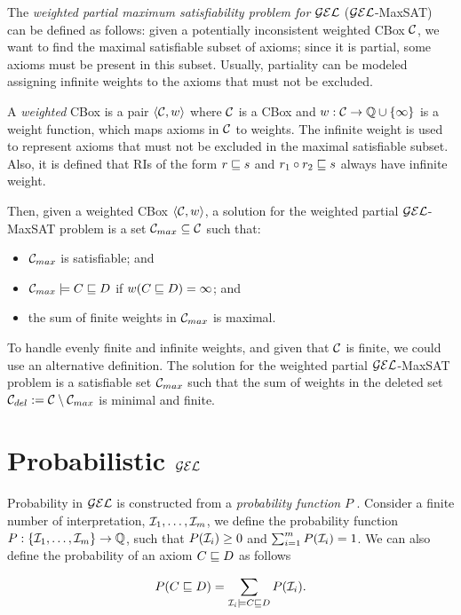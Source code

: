 The \emph{weighted partial maximum satisfiability problem for} $\mathcal{GEL}$ ($\mathcal{GEL}$-MaxSAT) can be defined as follows: given a potentially inconsistent weighted CBox $\mathcal{C}$, we want to find the maximal satisfiable subset of axioms; since it is partial, some axioms must be present in this subset. Usually, partiality can be modeled assigning infinite weights to the axioms that must not be excluded.

A \emph{weighted} CBox is a pair $\langle\mathcal{C}, w\rangle$ where $\mathcal{C}$ is a CBox and $w: \mathcal{C} \to \mathbb{Q} \cup \{\infty\}$ is a weight function, which maps axioms in $\mathcal{C}$ to weights. The infinite weight is used to represent axioms that must not be excluded in the maximal satisfiable subset. Also, it is defined that RIs of the form $r \sqsubseteq s$ and $r_1 \circ r_2 \sqsubseteq s$ always have infinite weight.

Then, given a weighted CBox $\langle\mathcal{C}, w\rangle$, a solution for the weighted partial $\mathcal{GEL}$-MaxSAT problem is a set $\mathcal{C}_{max} \subseteq \mathcal{C}$ such that:
\begin{itemize}
	\item $\mathcal{C}_{max}$ is satisfiable; and
	\item $\mathcal{C}_{max} \models C \sqsubseteq D$ if $w(C \sqsubseteq D) = \infty$; and
	\item the sum of finite weights in $\mathcal{C}_{max}$ is maximal.
\end{itemize}

To handle evenly finite and infinite weights, and given that $\mathcal{C}$ is finite, we could use an alternative definition. The solution for the weighted partial $\mathcal{GEL}$-MaxSAT problem is a satisfiable set $\mathcal{C}_{max}$ such that the sum of weights in the deleted set $\mathcal{C}_{del} := \mathcal{C} \setminus \mathcal{C}_{max}$ is minimal and finite.

\section{Probabilistic \texorpdfstring{$\mathcal{GEL}$}{GEL}}
\label{sec:pgel}

Probability in $\mathcal{GEL}$ is constructed from a \emph{probability function} $P$ \citep{Fin2020}. Consider a finite number of interpretation, $\mathcal{I}_1, \dots, \mathcal{I}_m$, we define the probability function $P: \{\mathcal{I}_1, \dots, \mathcal{I}_m\} \to \mathbb{Q}$, such that $P(\mathcal{I}_i) \geq 0$ and $\sum_{i = 1}^m P(\mathcal{I}_i) = 1$. We can also define the probability of an axiom $C \sqsubseteq D$ as follows

\begin{equation}
	\label{eq:axiom-pbox}
	P(C \sqsubseteq D) = \sum_{\mathcal{I}_i \models C \sqsubseteq D} P(\mathcal{I}_i).
\end{equation}

